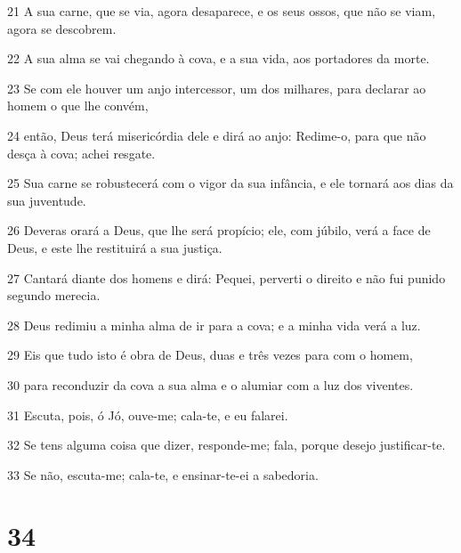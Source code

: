 \par 21 A sua carne, que se via, agora desaparece, e os seus ossos, que não se viam, agora se descobrem.
\par 22 A sua alma se vai chegando à cova, e a sua vida, aos portadores da morte.
\par 23 Se com ele houver um anjo intercessor, um dos milhares, para declarar ao homem o que lhe convém,
\par 24 então, Deus terá misericórdia dele e dirá ao anjo: Redime-o, para que não desça à cova; achei resgate.
\par 25 Sua carne se robustecerá com o vigor da sua infância, e ele tornará aos dias da sua juventude.
\par 26 Deveras orará a Deus, que lhe será propício; ele, com júbilo, verá a face de Deus, e este lhe restituirá a sua justiça.
\par 27 Cantará diante dos homens e dirá: Pequei, perverti o direito e não fui punido segundo merecia.
\par 28 Deus redimiu a minha alma de ir para a cova; e a minha vida verá a luz.
\par 29 Eis que tudo isto é obra de Deus, duas e três vezes para com o homem,
\par 30 para reconduzir da cova a sua alma e o alumiar com a luz dos viventes.
\par 31 Escuta, pois, ó Jó, ouve-me; cala-te, e eu falarei.
\par 32 Se tens alguma coisa que dizer, responde-me; fala, porque desejo justificar-te.
\par 33 Se não, escuta-me; cala-te, e ensinar-te-ei a sabedoria.

\chapter{34}


